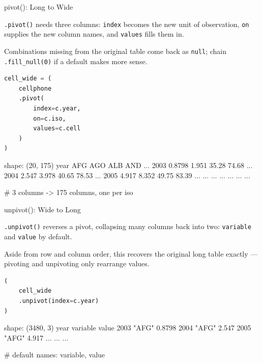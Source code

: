 \documentclass[8pt,aspectratio=169]{beamer}
\begin{document}
\begin{frame}[fragile]{pivot(): Long to Wide}
\begin{splitcode}{%

\texttt{.pivot()} needs three columns: \texttt{index} becomes the new unit of observation, \texttt{on} supplies the new column names, and \texttt{values} fills them in.

Combinations missing from the original table come back as \texttt{null}; chain \texttt{.fill\_null(0)} if a default makes more sense.

}
\begin{lstlisting}[language=Python]
cell_wide = (
    cellphone
    .pivot(
        index=c.year,
        on=c.iso,
        values=c.cell
    )
)
\end{lstlisting}
\begin{codeoutput}
shape: (20, 175)
year  AFG      AGO      ALB    AND    ...
2003  0.8798   1.951    35.28  74.68  ...
2004  2.547    3.978    40.65  78.53  ...
2005  4.917    8.352    49.75  83.39  ...
...   ...      ...      ...    ...    ...

# 3 columns -> 175 columns, one per iso
\end{codeoutput}
\end{splitcode}
\end{frame}

\begin{frame}[fragile]{unpivot(): Wide to Long}
\begin{splitcode}{%

\texttt{.unpivot()} reverses a pivot, collapsing many columns back into two: \texttt{variable} and \texttt{value} by default.

Aside from row and column order, this recovers the original long table exactly --- pivoting and unpivoting only rearrange values.

}
\begin{lstlisting}[language=Python]
(
    cell_wide
    .unpivot(index=c.year)
)
\end{lstlisting}
\begin{codeoutput}
shape: (3480, 3)
year  variable  value
2003  "AFG"     0.8798
2004  "AFG"     2.547
2005  "AFG"     4.917
...   ...       ...

# default names: variable, value
\end{codeoutput}
\end{splitcode}
\end{frame}
\end{document}

